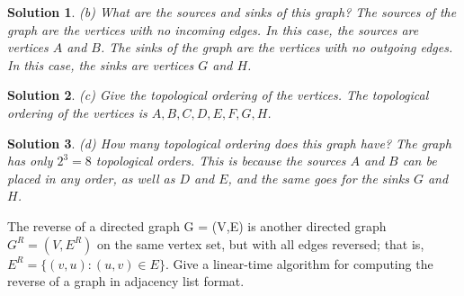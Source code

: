 \documentclass[boxes]{rutgers_hw}
\newtheorem*{solutions}{Solution}
\begin{document}
    \begin{solutions}
        (b) What are the sources and sinks of this graph?
        The sources of the graph are the vertices with no incoming edges. In this case, the sources are vertices $A$ and $B$. The sinks of the graph are the vertices with no outgoing edges. In this case, the sinks are vertices $G$ and $H$.
    \end{solutions}

    \begin{solutions}
        (c) Give the topological ordering of the vertices.
        The topological ordering of the vertices is $A, B, C, D, E, F, G, H$.
    \end{solutions}

    \begin{solutions}
        (d) How many topological ordering does this graph have?
        The graph has only $2^3 = 8$ topological orders. This is because the sources $A$ and $B$ can be placed in any order, as well as $D$ and $E$, and the same goes for the sinks $G$ and $H$. 
    \end{solutions}

    \pagebreak

    \begin{exern}{3.5}
        The reverse of a directed graph G = (V,E) is another directed graph $G^R = (V,E^R)$ on the same
        vertex set, but with all edges reversed; that is, $E^R = \{(v, u) : (u, v) \in E\}$.
        Give a linear-time algorithm for computing the reverse of a graph in adjacency list format.
    \end{exern}
\end{document}
